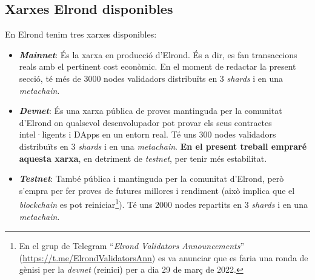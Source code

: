 \documentclass[11pt,a4paper]{article}
\begin{document}
\subsection{Xarxes Elrond disponibles}\label{sub:xarxes}
En Elrond tenim tres xarxes disponibles:
\begin{itemize}
\item \textbf{\textit{Mainnet}}: És la xarxa en producció d'Elrond. És a dir, es fan transaccions reals amb  el pertinent cost econòmic. En el moment de redactar la present secció, té més de 3000 nodes validadors distribuïts en 3 \textit{shards} i en una \textit{metachain}.
\item \textbf{\textit{Devnet}}: És una xarxa pública de proves mantinguda per la comunitat d'Elrond on qualsevol desenvolupador pot provar els seus contractes intel·ligents i DApps en un entorn real. Té uns 300 nodes validadors distribuïts en 3 \textit{shards} i en una \textit{metachain}. \textbf{En el present treball empraré aquesta xarxa}, en detriment de \textit{testnet}, per tenir més estabilitat.
\item \textbf{\textit{Testnet}}: També pública i mantinguda per la comunitat d'Elrond, però s'empra per fer proves de futures millores i rendiment \cite{mincub2019-2} (això implica que el \textit{blockchain} es pot reiniciar\footnote{En el grup de Telegram ``\textit{Elrond Validators Announcements}'' (\url{https://t.me/ElrondValidatorsAnn}) es va anunciar que es faria una ronda de gènisi per la \textit{devnet} (reinici) per a dia 29 de març de 2022.}). Té uns 2000 nodes repartits en 3 \textit{shards} i en una \textit{metachain}.
\end{itemize}
\end{document}
